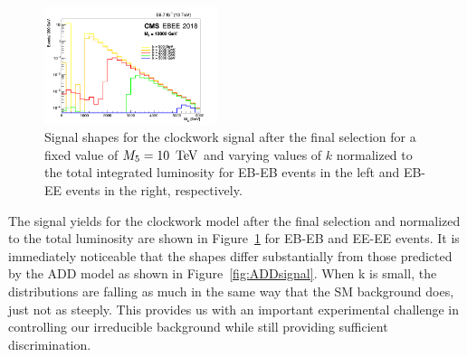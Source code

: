 \begin{figure}[tbp!]
\begin{center}
    \includegraphics[angle=0,width=0.45\textwidth]{fig/2018EBEE.png}
\end{center}
\caption{Signal shapes for the clockwork signal after the final selection for a fixed value of $M_5 = 10~\,\text{Te\hspace{-.08em}V}$ and varying values of $k$ normalized to the total integrated luminosity for EB-EB events in the left and EB-EE events in the right, respectively.
}
\label{fig:CWSignal}
\end{figure}



The signal yields for the clockwork model after the final selection and normalized to the total luminosity are shown in Figure~\ref{fig:CWSignal} for EB-EB and EE-EE events. It is immediately noticeable that the shapes differ substantially from those predicted by the ADD model as shown in Figure~\ref{fig:ADDsignal}. When k is small, the distributions are falling as much in the same way that the SM background does, just not as steeply. This provides us with an important experimental challenge in controlling our irreducible background while still providing sufficient discrimination. 

